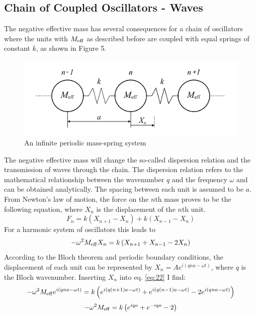 \documentclass[12pt]{article}
\begin{document}
\subsection{Chain of Coupled Oscillators - Waves}\label{sec:coupled:waves}
The negative effective mass has several consequences for a chain of oscillators where the units with $M_{\rm eff}$ as described before are coupled with equal springs of constant $k$, as shown in Figure 5. 
\begin{figure}[hbt]
  \includegraphics[width=0.8\columnwidth]{fundamentals/chain_of_oscillators.pdf}
  \caption{An infinite periodic mass-spring system}
\end{figure}
The negative effective mass will change the so-called dispersion relation and the transmission of waves through the chain. The dispersion relation refers to the mathematical relationship between the wavenumber $q$ and the frequency $\omega$ and can be obtained analytically. The spacing between each unit is assumed to be $a$. From Newton's law of motion, the force on the $n$th mass proves to be the following equation, where $X_n$ is the displacement of the $n$th unit.
\begin{equation}\label{eq:21}
	F_{n} = k (X_{n+1} - X_n) + k(X_{n-1} - X_n)
\end{equation}
For a harmonic system of oscillators this leads to
\begin{equation}\label{eq:22}
-\omega^2 M_{\rm eff} X_n = k \left(X_{n+1} + X_{n-1} - 2X_n \right)	
\end{equation}
According to the Bloch theorem and periodic boundary conditions, the displacement of each unit can be represented by $X_n = Ae^{i(qna - \omega t)}$, where $q$ is the Bloch wavenumber.  Inserting $X_n$ into eq. \ref{eq:22} I find:
\begin{equation}\label{eq:23}
	-\omega^2 M_{\rm eff} e^{i(qna - \omega t)} = k\left(e^{i(q(n+1)a - \omega t)} + e^{i(q(n-1)a - \omega t)} - 2e^{i(qna - \omega t)}\right)	
\end{equation}
\begin{equation}\label{eq:24}
	-\omega^2 M_{\rm eff} = k\left(e^{iqa} + e^{-iqa} - 2\right)
\end{equation}
\end{document}
